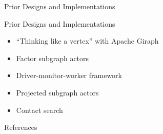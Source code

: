 \documentclass[12pt]{beamer}
\begin{document}
\begin{section}{Prior Designs and Implementations}

\begin{frame}{Prior Designs and Implementations}
  \begin{itemize}
    \item  ``Thinking like a vertex'' with Apache Giraph
    \item Factor subgraph actors
    \item Driver-monitor-worker framework
    \item Projected subgraph actors \citep{Tatton2022b}
    \item Contact search
  \end{itemize}
\end{frame}

\end{section}

\begin{frame}[allowframebreaks]{References}
  \printbibliography
\end{frame}
\end{document}
